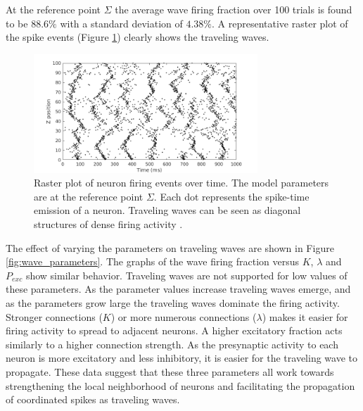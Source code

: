 At the reference  point $\Sigma$ the average wave firing fraction over 100 trials is found to be $88.6\%$ with a standard deviation of $4.38\%$.
A representative raster plot of the spike events (Figure \ref{fig:sigma_raster}) clearly shows the traveling waves.
\begin{figure}[!htb]
  \centering
  \includegraphics[width=0.75\textwidth]{fig/baseline}
  \caption{Raster plot of neuron firing events over time. The model parameters are at the reference  point $\Sigma$. 
	Each dot represents the spike-time emission of a neuron. 
	Traveling waves can be seen as diagonal structures of dense firing activity \citet{Senk2020}. }
  \label{fig:sigma_raster}
\end{figure}
\FloatBarrier

The effect of varying the parameters on traveling waves are shown in Figure \ref{fig:wave_parameters}.
The graphs of the wave firing fraction versus $K$, $\lambda$ and $P_{exc}$ show similar behavior.
Traveling waves are not supported for low values of these parameters.
As the parameter values increase traveling waves emerge, and as the parameters grow large the traveling waves dominate the firing activity.
Stronger connections ($K$) or more numerous connections ($\lambda$) makes it easier for firing activity to spread to adjacent neurons.
A higher excitatory fraction acts similarly to a higher connection strength. 
As the presynaptic activity to each neuron is more excitatory and less inhibitory, it is easier for the traveling wave to propagate.
These data suggest that these three parameters all work towards strengthening the local neighborhood of neurons and facilitating the propagation of coordinated spikes as traveling waves.

